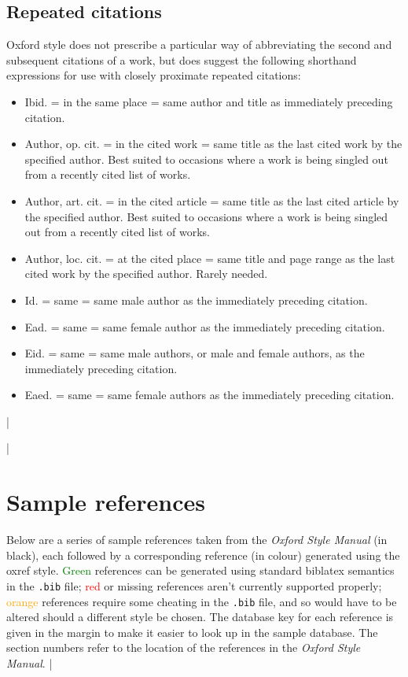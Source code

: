 \documentclass[extrafontsizes,11pt,a4paper,oneside]{memoir}
\begin{document}
\section{Repeated citations}

Oxford style does not prescribe a particular way of abbreviating the second and subsequent citations of a work, but does suggest the following shorthand expressions for use with closely proximate repeated citations:

\begin{itemize}
  \item Ibid. = in the same place = same author and title as immediately preceding citation.
  \item Author, op. cit. = in the cited work = same title as the last cited work by the specified author. Best suited to occasions where a work is being singled out from a recently cited list of works. 
  \item Author, art. cit. = in the cited article = same title as the last cited article by the specified author. Best suited to occasions where a work is being singled out from a recently cited list of works.
  \item Author, loc. cit. = at the cited place = same title and page range as the last cited work by the specified author. Rarely needed.
  \item Id. = same = same male author as the immediately preceding citation.
  \item Ead. = same = same female author as the immediately preceding citation.
  \item Eid. = same = same male authors, or male and female authors, as the immediately preceding citation.
  \item Eaed. = same = same female authors as the immediately preceding citation.
\end{itemize}
|


\todoc|
\chapter{Sample references}

Below are a series of sample references taken from the \emph{Oxford Style Manual} (in black), each followed by a corresponding reference (in colour) generated using the \textsf{oxref} style. \textcolor{Green}{Green} references can be generated using standard \textsf{biblatex} semantics in the \texttt{.bib} file; \textcolor{red}{red} or missing references aren't currently supported properly; \textcolor{orange}{orange} references require some cheating in the \texttt{.bib} file, and so would have to be altered should a different style be chosen. The database key for each reference is given in the margin to make it easier to look up in the sample database. The section numbers refer to the location of the references in the \emph{Oxford Style Manual}.
|
\end{document}
